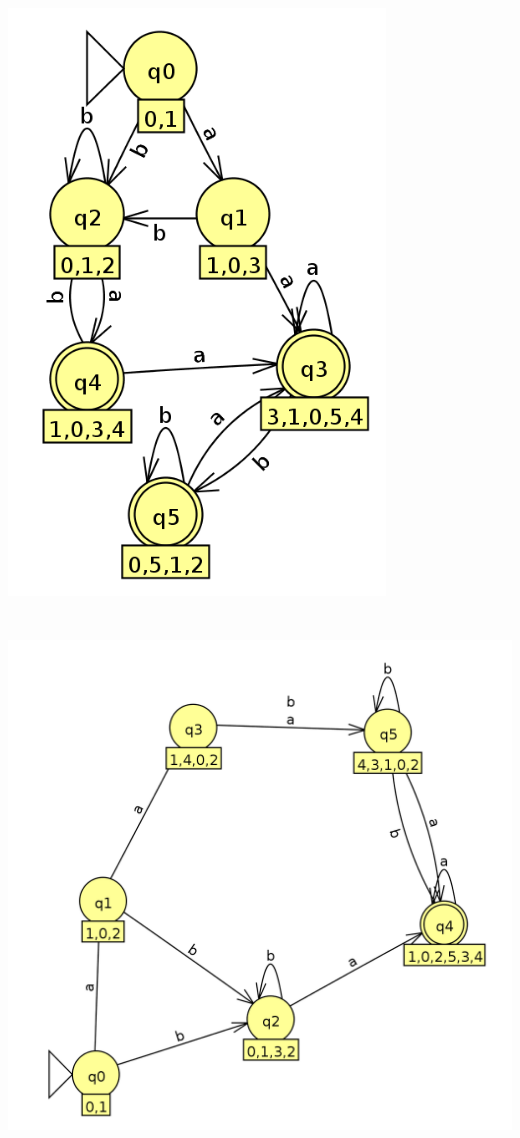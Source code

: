 \documentclass[a4paper,12pt]{article}
\begin{document}
\section{}
\includegraphics[width=10cm]{q9}
\section{}
\includegraphics[width=15cm]{q10}
\end{document}
